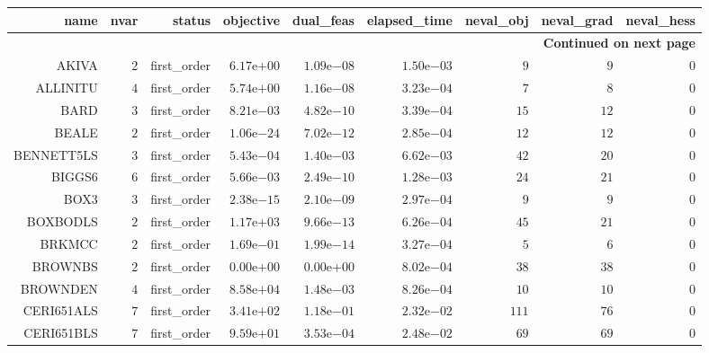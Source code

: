\begin{longtable}{rrrrrrrrr}
\hline
name & nvar & status & objective & dual\_feas & elapsed\_time & neval\_obj & neval\_grad & neval\_hess \\\hline
\endhead
\hline
\multicolumn{9}{r}{{\bfseries Continued on next page}}\\
\hline
\endfoot
\endlastfoot
AKIVA & \(     2\) & first\_order & \( 6.17\)e\(+00\) & \( 1.09\)e\(-08\) & \( 1.50\)e\(-03\) & \(     9\) & \(     9\) & \(     0\) \\
ALLINITU & \(     4\) & first\_order & \( 5.74\)e\(+00\) & \( 1.16\)e\(-08\) & \( 3.23\)e\(-04\) & \(     7\) & \(     8\) & \(     0\) \\
BARD & \(     3\) & first\_order & \( 8.21\)e\(-03\) & \( 4.82\)e\(-10\) & \( 3.39\)e\(-04\) & \(    15\) & \(    12\) & \(     0\) \\
BEALE & \(     2\) & first\_order & \( 1.06\)e\(-24\) & \( 7.02\)e\(-12\) & \( 2.85\)e\(-04\) & \(    12\) & \(    12\) & \(     0\) \\
BENNETT5LS & \(     3\) & first\_order & \( 5.43\)e\(-04\) & \( 1.40\)e\(-03\) & \( 6.62\)e\(-03\) & \(    42\) & \(    20\) & \(     0\) \\
BIGGS6 & \(     6\) & first\_order & \( 5.66\)e\(-03\) & \( 2.49\)e\(-10\) & \( 1.28\)e\(-03\) & \(    24\) & \(    21\) & \(     0\) \\
BOX3 & \(     3\) & first\_order & \( 2.38\)e\(-15\) & \( 2.10\)e\(-09\) & \( 2.97\)e\(-04\) & \(     9\) & \(     9\) & \(     0\) \\
BOXBODLS & \(     2\) & first\_order & \( 1.17\)e\(+03\) & \( 9.66\)e\(-13\) & \( 6.26\)e\(-04\) & \(    45\) & \(    21\) & \(     0\) \\
BRKMCC & \(     2\) & first\_order & \( 1.69\)e\(-01\) & \( 1.99\)e\(-14\) & \( 3.27\)e\(-04\) & \(     5\) & \(     6\) & \(     0\) \\
BROWNBS & \(     2\) & first\_order & \( 0.00\)e\(+00\) & \( 0.00\)e\(+00\) & \( 8.02\)e\(-04\) & \(    38\) & \(    38\) & \(     0\) \\
BROWNDEN & \(     4\) & first\_order & \( 8.58\)e\(+04\) & \( 1.48\)e\(-03\) & \( 8.26\)e\(-04\) & \(    10\) & \(    10\) & \(     0\) \\
CERI651ALS & \(     7\) & first\_order & \( 3.41\)e\(+02\) & \( 1.18\)e\(-01\) & \( 2.32\)e\(-02\) & \(   111\) & \(    76\) & \(     0\) \\
CERI651BLS & \(     7\) & first\_order & \( 9.59\)e\(+01\) & \( 3.53\)e\(-04\) & \( 2.48\)e\(-02\) & \(    69\) & \(    69\) & \(     0\) \\

\end{longtable}
